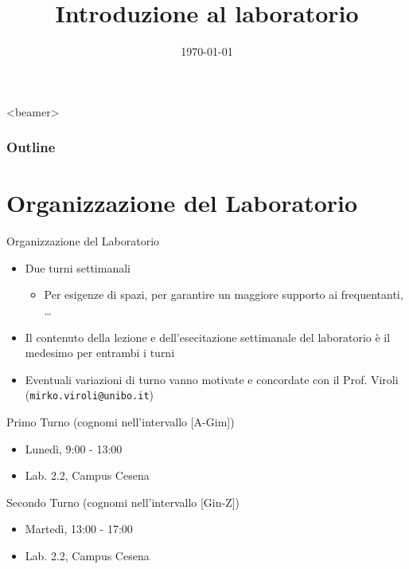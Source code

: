 \documentclass[presentation]{beamer}
\title[{\lab} -- Introduzione]{Introduzione al laboratorio}
\date[\today]{\today}
\begin{document}
\frame[label=coverpage]{\titlepage}

\begin{frame}<beamer>
	\frametitle{Outline}
	\tableofcontents[]
\end{frame}

\section{Organizzazione del Laboratorio}

\begin{frame}{Organizzazione del Laboratorio}

\begin{itemize}
\item Due turni settimanali
\begin{itemize}
\item Per esigenze di spazi, per garantire un maggiore supporto ai frequentanti, \dots
\end{itemize}
\item Il contenuto della lezione e dell'esecitazione settimanale del laboratorio è il medesimo per entrambi i turni
\item Eventuali variazioni di turno vanno motivate e concordate con il Prof. Viroli (\texttt{mirko.viroli@unibo.it})
\end{itemize}

\begin{block}{Primo Turno (cognomi nell'intervallo [A-Gim])}
\begin{itemize}
\item Lunedì, 9:00 - 13:00
\item Lab. 2.2, Campus Cesena
\end{itemize}
\end{block}

\begin{block}{Secondo Turno (cognomi nell'intervallo [Gin-Z])}
\begin{itemize}
\item Martedì, 13:00 - 17:00
\item Lab. 2.2, Campus Cesena
\end{itemize}
\end{block}

\end{frame}
\end{document}

